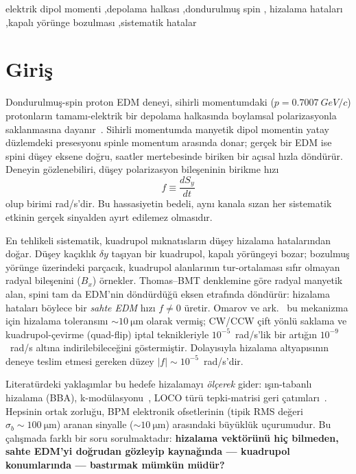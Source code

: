 \documentclass[preprint,12pt]{elsarticle}
\begin{document}
\begin{frontmatter}
\begin{keyword}
elektrik dipol momenti \sep depolama halkası \sep dondurulmuş spin \sep
hizalama hataları \sep kapalı yörünge bozulması \sep sistematik hatalar
\end{keyword}

\end{frontmatter}

\section{Giriş}
\label{sec:giris}

Dondurulmuş-spin proton EDM deneyi, sihirli momentumdaki
($p=\SI{0.7007}{GeV/c}$) protonların tamamı-elektrik bir depolama
halkasında boylamsal polarizasyonla saklanmasına
dayanır~\cite{todo-pedm}. Sihirli momentumda manyetik dipol momentin
yatay düzlemdeki presesyonu spinle momentum arasında donar; gerçek bir
EDM ise spini düşey eksene doğru, saatler mertebesinde biriken bir
açısal hızla döndürür. Deneyin gözlenebiliri, düşey polarizasyon
bileşeninin birikme hızı
\begin{equation}
f \equiv \frac{dS_y}{dt}
\label{eq:f-tanim}
\end{equation}
olup birimi rad/s'dir. Bu hassasiyetin bedeli, aynı kanala sızan her
sistematik etkinin gerçek sinyalden ayırt edilemez olmasıdır.

En tehlikeli sistematik, kuadrupol mıknatısların düşey hizalama
hatalarından doğar. Düşey kaçıklık $\delta y$ taşıyan bir kuadrupol,
kapalı yörüngeyi bozar; bozulmuş yörünge üzerindeki parçacık, kuadrupol
alanlarının tur-ortalaması sıfır olmayan radyal bileşenini ($B_x$)
örnekler. Thomas--BMT denklemine göre radyal manyetik alan, spini tam
da EDM'nin döndürdüğü eksen etrafında döndürür: hizalama hataları
böylece bir \emph{sahte EDM} hızı $f\neq0$ üretir. Omarov ve
ark.~\cite{todo-omarov} bu mekanizma için hizalama toleransını
$\sim\SI{10}{\micro\meter}$ olarak vermiş; CW/CCW çift yönlü saklama ve
kuadrupol-çevirme (quad-flip) iptal teknikleriyle $10^{-5}$~rad/s'lik
bir artığın $10^{-9}$~rad/s altına indirilebileceğini göstermiştir.
Dolayısıyla hizalama altyapısının deneye teslim etmesi gereken düzey
$|f|\sim10^{-5}$~rad/s'dir.

Literatürdeki yaklaşımlar bu hedefe hizalamayı \emph{ölçerek} gider:
ışın-tabanlı hizalama (BBA), k-modülasyonu~\cite{todo-bba}, LOCO türü
tepki-matrisi geri çatımları~\cite{todo-loco}. Hepsinin ortak zorluğu,
BPM elektronik ofsetlerinin (tipik RMS değeri
$\sigma_b\sim\SI{100}{\micro\meter}$) aranan sinyalle
($\sim\SI{10}{\micro\meter}$) arasındaki büyüklük uçurumudur. Bu
çalışmada farklı bir soru sorulmaktadır: \textbf{hizalama vektörünü hiç
bilmeden, sahte EDM'yi doğrudan gözleyip kaynağında --- kuadrupol
konumlarında --- bastırmak mümkün müdür?}
\end{document}
